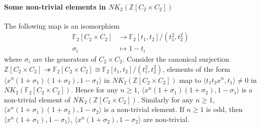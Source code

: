 \paragraph{Some non-trivial elements in $NK_2(\mathbb{Z}[C_2\times C_2])$}
The following map is an isomorphism
\begin{align*}
\mathbb{F}_2[C_2\times C_2] &\longrightarrow \mathbb{F}_2[t_1,t_2]/(t_1^2,t_2^2)\\
\sigma_i &\mapsto 1-t_i
\end{align*}
where $\sigma_i$ are the generators of $C_2\times C_2$. 
Consider the canonical surjection $\mathbb{Z}[C_2\times C_2]\twoheadrightarrow \mathbb{F}_2[C_2\times C_2]\cong \mathbb{F}_2[t_1,t_2]/(t_1^2,t_2^2)$,  elements of the form $\langle x^n(1+\sigma_1)(1+\sigma_2),1-\sigma_1 \rangle$ in $NK_2(\mathbb{Z}[C_2\times C_2])$ map to $\langle t_1t_2x^n,t_1\rangle \neq 0$ in $NK_2(\mathbb{F}_2[C_2\times C_2])$. Hence for any $n\geq 1$, $\langle x^n(1+\sigma_1)(1+\sigma_2),1-\sigma_1 \rangle$ is a non-trivial element of $NK_2(\mathbb{Z}[C_2\times C_2])$. 
Similarly for any $n\geq 1$, $\langle x^n(1+\sigma_1)(1+\sigma_2),1-\sigma_2 \rangle$ is a non-trivial element. If $n\geq 1$ is odd, then $\langle x^n(1+\sigma_1),1-\sigma_1 \rangle$, $\langle x^n(1+\sigma_2),1-\sigma_2 \rangle$ are non-trivial. 








































